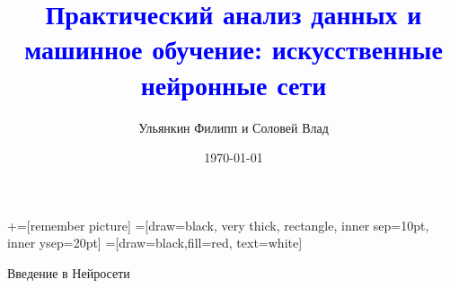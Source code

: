 \documentclass[notes,12pt, aspectratio=169]{beamer}
\title[]{\textcolor{blue}{Практический анализ данных и машинное обучение: искусственные нейронные сети}}
\author{Ульянкин Филипп и Соловей Влад}
\date{\today}
\begin{document}
\newcommand\marktopleft[1]{%
    \tikz[overlay,remember picture] 
        \node (marker-#1-a) at (-.3em,.3em) {};%
}
\newcommand\markbottomright[2]{%
    \tikz[overlay,remember picture] 
        \node (marker-#1-b) at (0em,0em) {};%
}
+=[remember picture] 
 =[draw=black, very thick, rectangle, inner sep=10pt, inner ysep=20pt]
 =[draw=black,fill=red, text=white]

\begin{frame}
\maketitle
\centering Введение в Нейросети
\end{frame}


{
\begin{frame}
\end{frame}
}
\end{document}

